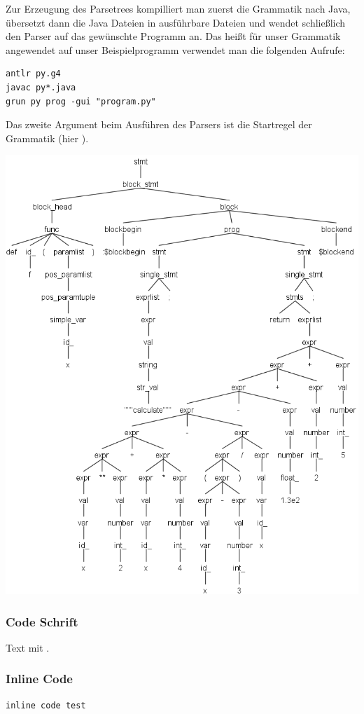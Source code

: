 Zur Erzeugung des Parsetrees kompilliert man zuerst die Grammatik nach Java, übersetzt dann die Java Dateien in ausführbare Dateien und wendet schließlich den Parser auf das gewünschte Programm an. Das heißt für unser Grammatik angewendet auf unser Beispielprogramm verwendet man die folgenden Aufrufe:
\begin{lstlisting}
antlr py.g4
javac py*.java
grun py prog -gui "program.py"
\end{lstlisting}
Das zweite Argument  beim Ausführen des Parsers ist die Startregel der Grammatik (hier ).
\begin{center}
 \includegraphics[width=0.8\linewidth]{Bilder/program_func_parse_tree2.png}
  \label{g:tree}
\end{center}



\clearpage
\nocite{*}
\printbibliography



\subsubsection*{Code Schrift}
Text mit   .

\subsubsection*{Inline Code}
\begin{lstlisting}[caption=CAP]
inline code test
\end{lstlisting}

